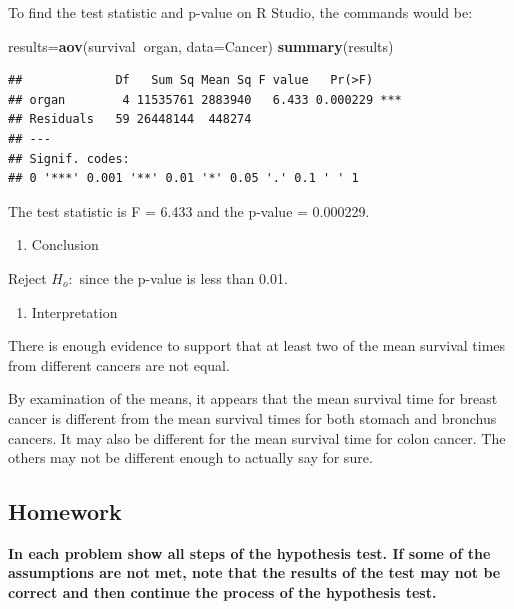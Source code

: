 \documentclass[
]{book}
\newenvironment{Shaded}{\begin{snugshade}}{\end{snugshade}}
\newcommand{\DataTypeTok}[1]{\textcolor[rgb]{0.13,0.29,0.53}{#1}}
\newcommand{\KeywordTok}[1]{\textcolor[rgb]{0.13,0.29,0.53}{\textbf{#1}}}
\newcommand{\NormalTok}[1]{#1}
\newcommand{\OperatorTok}[1]{\textcolor[rgb]{0.81,0.36,0.00}{\textbf{#1}}}
\providecommand{\tightlist}{%
  \setlength{\itemsep}{0pt}\setlength{\parskip}{0pt}}
\begin{document}
To find the test statistic and p-value on R Studio, the commands would be:

\begin{Shaded}
\begin{Highlighting}[]
\NormalTok{results=}\KeywordTok{aov}\NormalTok{(survival}\OperatorTok{~}\NormalTok{organ, }\DataTypeTok{data=}\NormalTok{Cancer)}
\KeywordTok{summary}\NormalTok{(results)}
\end{Highlighting}
\end{Shaded}

\begin{verbatim}
##             Df   Sum Sq Mean Sq F value   Pr(>F)    
## organ        4 11535761 2883940   6.433 0.000229 ***
## Residuals   59 26448144  448274                     
## ---
## Signif. codes:  
## 0 '***' 0.001 '**' 0.01 '*' 0.05 '.' 0.1 ' ' 1
\end{verbatim}

The test statistic is F = 6.433 and the p-value = 0.000229.

\begin{enumerate}
\def\labelenumi{\arabic{enumi}.}
\setcounter{enumi}{4}
\tightlist
\item
  Conclusion
\end{enumerate}

Reject \(H_o:\) since the p-value is less than 0.01.

\begin{enumerate}
\def\labelenumi{\arabic{enumi}.}
\setcounter{enumi}{5}
\tightlist
\item
  Interpretation
\end{enumerate}

There is enough evidence to support that at least two of the mean survival times from different cancers are not equal.

By examination of the means, it appears that the mean survival time for breast cancer is different from the mean survival times for both stomach and bronchus cancers. It may also be different for the mean survival time for colon cancer. The others may not be different enough to actually say for sure.

\hypertarget{homework-30}{%
\subsection{Homework}\label{homework-30}}

\textbf{In each problem show all steps of the hypothesis test. If some of the assumptions are not met, note that the results of the test may not be correct and then continue the process of the hypothesis test.}
\end{document}
